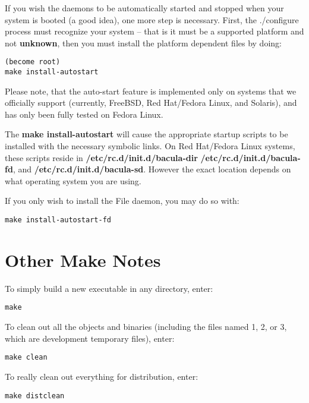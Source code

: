 If you wish the daemons to be automatically started and stopped when your
system is booted (a good idea), one more step is necessary. First, the
./configure process must recognize your system -- that is it must be a
supported platform and not {\bf unknown}, then you must install the platform
dependent files by doing: 

\footnotesize
\begin{verbatim}
(become root)
make install-autostart
\end{verbatim}
\normalsize

Please note, that the auto-start feature is implemented only on systems
that we officially support (currently, FreeBSD, Red Hat/Fedora Linux, and
Solaris), and has only been fully tested on Fedora Linux.

The {\bf make install-autostart} will cause the appropriate startup scripts
to be installed with the necessary symbolic links.  On Red Hat/Fedora Linux
systems, these scripts reside in {\bf /etc/rc.d/init.d/bacula-dir} {\bf
/etc/rc.d/init.d/bacula-fd}, and {\bf /etc/rc.d/init.d/bacula-sd}.  However
the exact location depends on what operating system you are using.

If you only wish to install the File daemon, you may do so with: 

\footnotesize
\begin{verbatim}
make install-autostart-fd
\end{verbatim}
\normalsize

\section{Other Make Notes}

To simply build a new executable in any directory, enter: 

\footnotesize
\begin{verbatim}
make
\end{verbatim}
\normalsize

To clean out all the objects and binaries (including the files named 1, 2, or
3, which are development temporary files), enter: 

\footnotesize
\begin{verbatim}
make clean
\end{verbatim}
\normalsize

To really clean out everything for distribution, enter: 

\footnotesize
\begin{verbatim}
make distclean
\end{verbatim}
\normalsize

